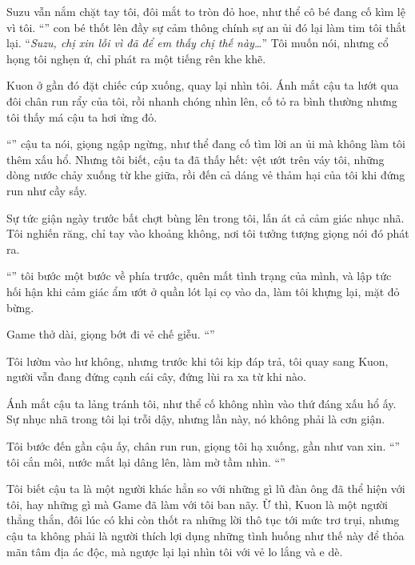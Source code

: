 \documentclass[../main.tex]{subfiles}
\begin{document}
Suzu vẫn nắm chặt tay tôi, đôi mắt to tròn đỏ hoe, như thể cô bé đang cố kìm lệ vì tôi. ``'' con bé thốt lên đầy sự cảm thông chính sự an ủi đó lại làm tim tôi thắt lại. ``\textit{Suzu, chị xin lỗi vì đã để em thấy chị thế này\dots}'' Tôi muốn nói, nhưng cổ họng tôi nghẹn ứ, chỉ phát ra một tiếng rên khe khẽ.

Kuon ở gần đó đặt chiếc cúp xuống, quay lại nhìn tôi. Ánh mắt cậu ta lướt qua đôi chân run rẩy của tôi, rồi nhanh chóng nhìn lên, cố tỏ ra bình thường nhưng tôi thấy má cậu ta hơi ửng đỏ.

``'' cậu ta nói, giọng ngập ngừng, như thể đang cố tìm lời an ủi mà không làm tôi thêm xấu hổ. Nhưng tôi biết, cậu ta đã thấy hết: vệt ướt trên váy tôi, những dòng nước chảy xuống từ khe giữa, rồi đến cả dáng vẻ thảm hại của tôi khi đứng run như cầy sấy.

Sự tức giận ngày trước bất chợt bùng lên trong tôi, lấn át cả cảm giác nhục nhã. Tôi nghiến răng, chỉ tay vào khoảng không, nơi tôi tưởng tượng giọng nói đó phát ra.

``'' tôi bước một bước về phía trước, quên mất tình trạng của mình, và lập tức hối hận khi cảm giác ẩm ướt ở quần lót lại cọ vào da, làm tôi khựng lại, mặt đỏ bừng.

Game thở dài, giọng bớt đi vẻ chế giễu. ``''

Tôi lườm vào hư không, nhưng trước khi tôi kịp đáp trả, tôi quay sang Kuon, người vẫn đang đứng cạnh cái cây, đứng lùi ra xa từ khi nào.

Ánh mắt cậu ta lảng tránh tôi, như thể cố không nhìn vào thứ đáng xấu hổ ấy. Sự nhục nhã trong tôi lại trỗi dậy, nhưng lần này, nó không phải là cơn giận.

Tôi bước đến gần cậu ấy, chân run run, giọng tôi hạ xuống, gần như van xin. ``'' tôi cắn môi, nước mắt lại dâng lên, làm mờ tầm nhìn. ``''

Tôi biết cậu ta là một người khác hẳn so với những gì lũ đàn ông đã thể hiện với tôi, hay những gì mà Game đã làm với tôi ban nãy. Ừ thì, Kuon là một người thẳng thắn, đôi lúc có khi còn thốt ra những lời thô tục tới mức trơ trụi, nhưng cậu ta không phải là người thích lợi dụng những tình huống như thế này để thỏa mãn tâm địa ác độc, mà ngược lại lại nhìn tôi với vẻ lo lắng và e dè.
\end{document}

